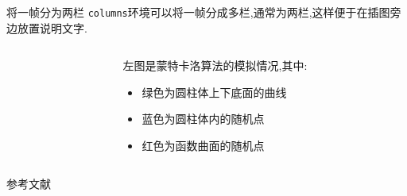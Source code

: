 \documentclass[14pt,hyperref={CJKbookmarks=true}]{beamer} %
\begin{document}
\begin{frame}{将一帧分为两栏}
	\texttt{columns}环境可以将一帧分成多栏,通常为两栏,这样便于在插图旁边放置说明文字.
	\begin{columns}[onlytextwidth]  %
		\begin{column}{0.55\textwidth}
		\end{column}
	\begin{column}{0.45\textwidth}
		左图是蒙特卡洛算法的模拟情况,其中:
		\begin{itemize}
			\item  绿色为圆柱体上下底面的曲线
			\item  蓝色为圆柱体内的随机点
			\item  红色为函数曲面的随机点
		\end{itemize}
	\end{column}
	\end{columns}
\end{frame}
\begin{frame}{参考文献}
\begin{thebibliography}{10}
	
\end{thebibliography}
\end{frame}
\end{document}
